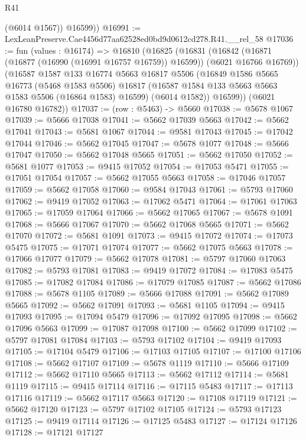 \begin{lexlean}{R41}
\begin{coremodule}
          (@6014 @1567))
        @16599))
@16991 := LexLeanPreserve.Cae4456d77aa62528ed0bd9d0612cd278.R41.__rel_58
@17036 := fun (values : @16174) =>
  @16810
    (@16825
      (@16831
        (@16842 (@16871 (@16877 (@16990 (@16991 @16757 @16759)) @16599)) (@6021 @16766 @16769))
        (@16587
          @1587
          @133
          @16774
          @5663
          @16817
          @5506
          (@16849
            @1586
            @5665
            @16773
            (@5468 @1583 @5506)
            @16817
            (@16587 @1584 @133 @5663 @5663 @1583 @5506 (@16864 @1583) @16599)
            (@6014 @1582))
          @16599))
      (@6021 @16780 @16782))
@17037 := (row : @5463) -> @5660
@17038 := @5678 @1067
@17039 := @5666 @17038
@17041 := @5662 @17039 @5663
@17042 := @5662 @17041
@17043 := @5681 @1067
@17044 := @9581 @17043
@17045 := @17042 @17044
@17046 := @5662 @17045
@17047 := @5678 @1077
@17048 := @5666 @17047
@17050 := @5662 @17048 @5665
@17051 := @5662 @17050
@17052 := @5681 @1077
@17053 := @9415 @17052
@17054 := @17053 @5471
@17055 := @17051 @17054
@17057 := @5662 @17055 @5663
@17058 := @17046 @17057
@17059 := @5662 @17058
@17060 := @9584 @17043
@17061 := @5793 @17060
@17062 := @9419 @17052
@17063 := @17062 @5471
@17064 := @17061 @17063
@17065 := @17059 @17064
@17066 := @5662 @17065
@17067 := @5678 @1091
@17068 := @5666 @17067
@17070 := @5662 @17068 @5665
@17071 := @5662 @17070
@17072 := @5681 @1091
@17073 := @9415 @17072
@17074 := @17073 @5475
@17075 := @17071 @17074
@17077 := @5662 @17075 @5663
@17078 := @17066 @17077
@17079 := @5662 @17078
@17081 := @5797 @17060 @17063
@17082 := @5793 @17081
@17083 := @9419 @17072
@17084 := @17083 @5475
@17085 := @17082 @17084
@17086 := @17079 @17085
@17087 := @5662 @17086
@17088 := @5678 @1105
@17089 := @5666 @17088
@17091 := @5662 @17089 @5665
@17092 := @5662 @17091
@17093 := @5681 @1105
@17094 := @9415 @17093
@17095 := @17094 @5479
@17096 := @17092 @17095
@17098 := @5662 @17096 @5663
@17099 := @17087 @17098
@17100 := @5662 @17099
@17102 := @5797 @17081 @17084
@17103 := @5793 @17102
@17104 := @9419 @17093
@17105 := @17104 @5479
@17106 := @17103 @17105
@17107 := @17100 @17106
@17108 := @5662 @17107
@17109 := @5678 @1119
@17110 := @5666 @17109
@17112 := @5662 @17110 @5665
@17113 := @5662 @17112
@17114 := @5681 @1119
@17115 := @9415 @17114
@17116 := @17115 @5483
@17117 := @17113 @17116
@17119 := @5662 @17117 @5663
@17120 := @17108 @17119
@17121 := @5662 @17120
@17123 := @5797 @17102 @17105
@17124 := @5793 @17123
@17125 := @9419 @17114
@17126 := @17125 @5483
@17127 := @17124 @17126
@17128 := @17121 @17127

\end{coremodule}
\end{lexlean}
